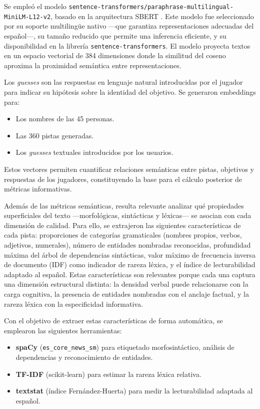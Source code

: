 \documentclass[../main.tex]{subfiles}
\begin{document}
Se empleó el modelo \texttt{sentence-transformers/paraphrase-multilingual-MiniLM-L12-v2}, basado en la arquitectura SBERT \cite{reimers2019}. Este modelo fue seleccionado por su soporte multilingüe nativo —que garantiza representaciones adecuadas del español—, su tamaño reducido que permite una inferencia eficiente, y su disponibilidad en la librería \texttt{sentence-transformers}. El modelo proyecta textos en un espacio vectorial de 384 dimensiones donde la similitud del coseno aproxima la proximidad semántica entre representaciones.

Los \textit{guesses} son las respuestas en lenguaje natural introducidas por el jugador para indicar su hipótesis sobre la identidad del objetivo. Se generaron embeddings para:

\begin{itemize}
    \item Los nombres de las 45 personas.
    \item Las 360 pistas generadas.
    \item Los \textit{guesses} textuales introducidos por los usuarios.
\end{itemize}

Estos vectores permiten cuantificar relaciones semánticas entre pistas, objetivos y respuestas de los jugadores, constituyendo la base para el cálculo posterior de métricas informativas.

Además de las métricas semánticas, resulta relevante analizar qué propiedades superficiales del texto —morfológicas, sintácticas y léxicas— se asocian con cada dimensión de calidad. Para ello, se extrajeron las siguientes características de cada pista: proporciones de categorías gramaticales (nombres propios, verbos, adjetivos, numerales), número de entidades nombradas reconocidas, profundidad máxima del árbol de dependencias sintácticas, valor máximo de frecuencia inversa de documento (IDF) como indicador de rareza léxica, y el índice de lecturabilidad adaptado al español. Estas características son relevantes porque cada una captura una dimensión estructural distinta: la densidad verbal puede relacionarse con la carga cognitiva, la presencia de entidades nombradas con el anclaje factual, y la rareza léxica con la especificidad informativa.

Con el objetivo de extraer estas características de forma automática, se emplearon las siguientes herramientas:

\begin{itemize}
    \item \textbf{spaCy} (\texttt{es\_core\_news\_sm}) para etiquetado morfosintáctico, análisis de dependencias y reconocimiento de entidades.
    \item \textbf{TF-IDF} (scikit-learn) para estimar la rareza léxica relativa.
    \item \textbf{textstat} (índice Fernández-Huerta) para medir la lecturabilidad adaptada al español.
\end{itemize}
\end{document}
